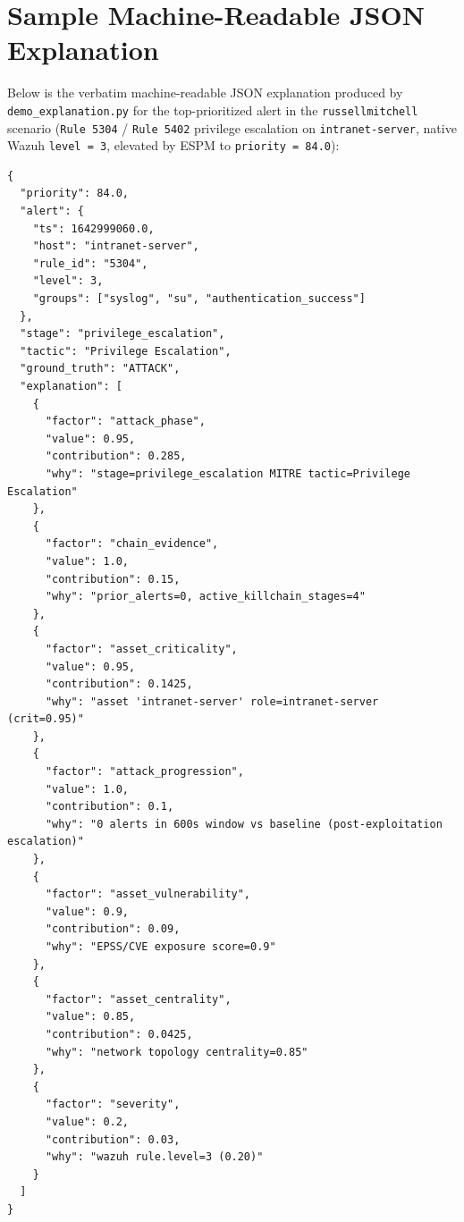 \chapter{Sample Machine-Readable JSON Explanation}
\label{app:json}

Below is the verbatim machine-readable JSON explanation produced by \texttt{demo\_explanation.py} for the top-prioritized alert in the \texttt{russellmitchell} scenario (\texttt{Rule 5304} / \texttt{Rule 5402} privilege escalation on \texttt{intranet-server}, native Wazuh \texttt{level = 3}, elevated by ESPM to \texttt{priority = 84.0}):

\begin{lstlisting}
{
  "priority": 84.0,
  "alert": {
    "ts": 1642999060.0,
    "host": "intranet-server",
    "rule_id": "5304",
    "level": 3,
    "groups": ["syslog", "su", "authentication_success"]
  },
  "stage": "privilege_escalation",
  "tactic": "Privilege Escalation",
  "ground_truth": "ATTACK",
  "explanation": [
    {
      "factor": "attack_phase",
      "value": 0.95,
      "contribution": 0.285,
      "why": "stage=privilege_escalation MITRE tactic=Privilege Escalation"
    },
    {
      "factor": "chain_evidence",
      "value": 1.0,
      "contribution": 0.15,
      "why": "prior_alerts=0, active_killchain_stages=4"
    },
    {
      "factor": "asset_criticality",
      "value": 0.95,
      "contribution": 0.1425,
      "why": "asset 'intranet-server' role=intranet-server (crit=0.95)"
    },
    {
      "factor": "attack_progression",
      "value": 1.0,
      "contribution": 0.1,
      "why": "0 alerts in 600s window vs baseline (post-exploitation escalation)"
    },
    {
      "factor": "asset_vulnerability",
      "value": 0.9,
      "contribution": 0.09,
      "why": "EPSS/CVE exposure score=0.9"
    },
    {
      "factor": "asset_centrality",
      "value": 0.85,
      "contribution": 0.0425,
      "why": "network topology centrality=0.85"
    },
    {
      "factor": "severity",
      "value": 0.2,
      "contribution": 0.03,
      "why": "wazuh rule.level=3 (0.20)"
    }
  ]
}
\end{lstlisting}
